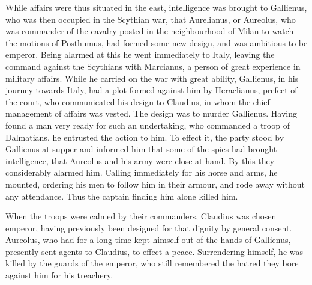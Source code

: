While affairs were thus situated in the east, intelligence was brought to Gallienus, who was then occupied in the Scythian war, that Aurelianus, or Aureolus, who was commander of the cavalry posted in the neighbourhood of Milan to watch the motions of Posthumus, had formed some new design, and was ambitious to be emperor. Being alarmed at this he went immediately to Italy, leaving the command against the Scythians with Marcianus, a person of great experience in military affairs. While he carried on the war with great ability, Gallienus, in his journey towards Italy, had a plot formed against him by Heraclianus, prefect of the court, who communicated his design to Claudius, in whom the chief management of affairs was vested. The design was to murder Gallienus. Having found a man very ready for such an undertaking, who commanded a troop of Dalmatians, he entrusted the action to him. To effect it, the party stood by Gallienus at supper and informed him that some of the spies had brought intelligence, that Aureolus and his army were close at hand. By this they considerably alarmed him. Calling immediately for his horse and arms, he mounted, ordering his men to follow him in their armour, and rode away without any attendance. Thus the captain finding him alone killed him.

When the troops were calmed by their commanders, Claudius was chosen emperor, having previously been designed for that dignity by general consent. Aureolus, who had for a long time kept himself out of the hands of Gallienus, presently sent agents to Claudius, to effect a peace. Surrendering himself, he was killed by the guards of the emperor, who still remembered the hatred they bore against him for his treachery.

